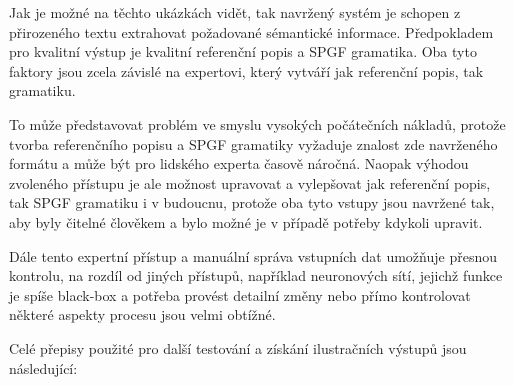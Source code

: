 Jak je možné na těchto ukázkách vidět, tak navržený systém je schopen z přirozeného textu extrahovat požadované sémantické informace.
Předpokladem pro kvalitní výstup je kvalitní referenční popis a SPGF gramatika.
Oba tyto faktory jsou zcela závislé na expertovi, který vytváří jak referenční popis, tak gramatiku.

To může představovat problém ve smyslu vysokých počátečních nákladů, protože tvorba referenčního popisu a SPGF gramatiky
vyžaduje znalost zde navrženého formátu a může být pro lidského experta časově náročná.
Naopak výhodou zvoleného přístupu je ale možnost upravovat a vylepšovat jak referenční popis, tak SPGF gramatiku i v budoucnu,
protože oba tyto vstupy jsou navržené tak, aby byly čitelné člověkem a bylo možné je v případě potřeby kdykoli upravit.

Dále tento expertní přístup a manuální správa vstupních dat umožňuje přesnou kontrolu, na rozdíl od jiných přístupů, například neuronových sítí, jejichž funkce je spíše black-box a
potřeba provést detailní změny nebo přímo kontrolovat některé aspekty procesu jsou velmi obtížné.

Celé přepisy použité pro další testování a získání ilustračních výstupů jsou následující:



